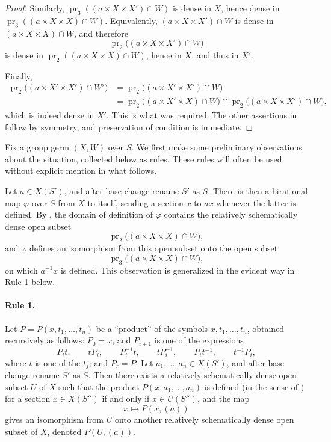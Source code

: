 \begin{proof}
Similarly,
\(\operatorname{pr}_3((a\times X\times X')\cap W)\) is dense in
\(X\), hence dense in
\(\operatorname{pr}_3((a\times X\times X)\cap W)\). Equivalently,
\((a\times X\times X')\cap W\) is dense in
\((a\times X\times X)\cap W\), and therefore
\[
  \operatorname{pr}_2\bigl((a\times X\times X')\cap W\bigr)
\]
is dense in
\(\operatorname{pr}_2((a\times X\times X)\cap W)\), hence in
\(X\), and thus in \(X'\).

Finally,
\[
\begin{aligned}
  \operatorname{pr}_2\bigl((a\times X'\times X')\cap W'\bigr)
  &=
  \operatorname{pr}_2\bigl((a\times X'\times X')\cap W\bigr)\\
  &=
  \operatorname{pr}_2\bigl((a\times X'\times X)\cap W\bigr)
  \cap
  \operatorname{pr}_2\bigl((a\times X\times X')\cap W\bigr),
\end{aligned}
\]
which is indeed dense in \(X'\). This is what was required. The
other assertions in  follow by symmetry, and preservation of
condition  is immediate.
\end{proof}

%
Fix a group germ \((X,W)\) over \(S\). We first make some
preliminary observations about the situation, collected below as
rules. These rules will often be used without explicit mention in
what follows.

Let \(a\in X(S')\), and after base change rename \(S'\) as \(S\).
There is then a birational map \(\varphi\) over \(S\) from \(X\)
to itself, sending a section \(x\) to \(ax\) whenever the latter is
defined. By , the domain of definition of \(\varphi\)
contains the relatively schematically dense open subset
\[
  \operatorname{pr}_2\bigl((a\times X\times X)\cap W\bigr),
\]
and \(\varphi\) defines an isomorphism from this open subset onto
the open subset
\[
  \operatorname{pr}_3\bigl((a\times X\times X)\cap W\bigr),
\]
on which \(a^{-1}x\) is defined. This observation is generalized
in the evident way in Rule 1 below.

\paragraph{Rule 1.}
Let \(P=P(x,t_1,\ldots,t_n)\) be a ``product'' of the symbols
\(x,t_1,\ldots,t_n\), obtained recursively as follows:
\(P_0=x\), and \(P_{i+1}\) is one of the expressions
\[
  P_i t,\qquad tP_i,\qquad P_i^{-1}t,\qquad
  tP_i^{-1},\qquad P_i t^{-1},\qquad t^{-1}P_i,
\]
where \(t\) is one of the \(t_j\); and \(P_r=P\). Let
\(a_1,\ldots,a_n\in X(S')\), and after base change rename \(S'\) as \(S\). Then there
exists a relatively schematically dense open subset \(U\) of \(X\) such that the
product \(P(x,a_1,\ldots,a_n)\) is defined (in the sense of
) for a section \(x\in X(S'')\) if and only if
\(x\in U(S'')\), and the map
\[
  x\longmapsto P(x,(a))
\]
gives an isomorphism from \(U\) onto another relatively
schematically dense open subset of \(X\), denoted
\(P(U,(a))\).

